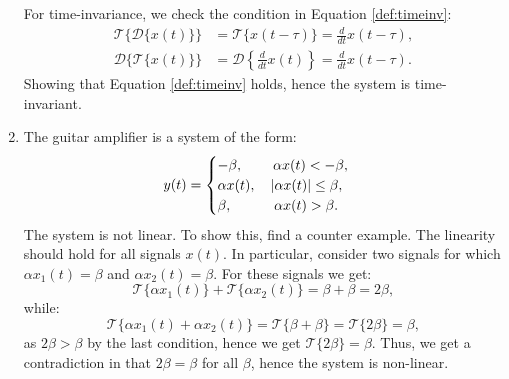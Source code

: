 \begin{enumerate}
For time-invariance, we check the condition in Equation \ref{def:timeinv}:
\begin{align*}
    \mathcal{T}\{\mathcal{D}\{x(t)\}\}&=\mathcal{T}\{x(t-\tau)\}=\frac{d}{dt}x(t-\tau), \\
    \mathcal{D}\{\mathcal{T}\{x(t)\}\}&=\mathcal{D}\left\{\frac{d}{dt}x(t)\right\}=\frac{d}{dt}x(t-\tau).
\end{align*}
Showing that Equation \ref{def:timeinv} holds, hence the system is time-invariant. 

\item The guitar amplifier is a system of the form:
$$y(t)=\begin{cases}
    -\beta, \quad \hspace{0.4cm} \alpha x(t)<-\beta,  \\
    \alpha x(t), \quad |\alpha x(t)|\le \beta, \\
    \beta, \quad \hspace{0.7cm}\alpha x(t)>\beta.
\end{cases}$$
The system is not linear. To show this, find a counter example. The linearity should hold for all signals $x(t)$. 
In particular, consider two signals for which $\alpha x_{1}(t)=\beta$ and $\alpha x_{2}(t)=\beta$. 
For these signals we get:
$$\mathcal{T}\{\alpha x_{1}(t)\}+\mathcal{T}\{\alpha x_{2}(t)\}=\beta+\beta=2\beta,$$
while:
$$\mathcal{T}\{\alpha x_{1}(t)+\alpha x_{2}(t)\}=\mathcal{T}\{\beta+\beta\}=\mathcal{T}\{2\beta\}=\beta,$$
as $2\beta > \beta$ by the last condition, hence we get $\mathcal{T}\{2\beta\}=\beta$. 
Thus, we get a contradiction in that $2\beta=\beta$ for all $\beta$, hence the system is non-linear. 


\end{enumerate}
